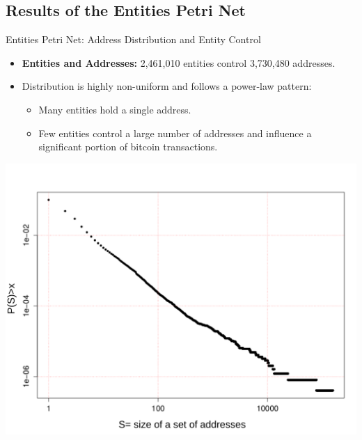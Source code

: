 \documentclass{beamer}
\begin{document}
\subsection{Results of the Entities Petri Net}
\begin{frame}{Entities Petri Net: Address Distribution and Entity Control}
    \footnotesize
    \begin{itemize}
        \item \textbf{Entities and Addresses:} 2,461,010 entities control 3,730,480 addresses.
        \item Distribution is highly non-uniform and follows a power-law pattern:
              \begin{itemize}
                  \item Many entities hold a single address.
                  \item Few entities control a large number of addresses and influence a significant portion of bitcoin transactions.
              \end{itemize}
    \end{itemize}
    \vspace{0.3cm}
    \centering
    \includegraphics[width=0.6\linewidth]{Entity_size}
    \label{fig_entity_CCDF}
\end{frame}
\end{document}
